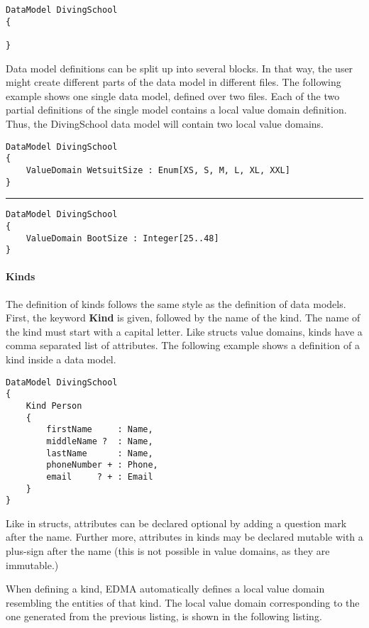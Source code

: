 \begin{lstlisting}[language=edma]
DataModel DivingSchool
{

}
\end{lstlisting}

Data model definitions can be split up into several blocks. In that
way, the user might create different parts of the data model in different
files. The following example shows one single data model, defined
over two files. Each of the two partial definitions of the single
model contains a local value domain definition. Thus, the DivingSchool
data model will contain two local value domains.

\begin{lstlisting}[language=edma]
DataModel DivingSchool
{
	ValueDomain WetsuitSize : Enum[XS, S, M, L, XL, XXL]
}
\end{lstlisting}
\hrule
\vspace{8pt}
\begin{lstlisting}[language=edma]
DataModel DivingSchool
{
	ValueDomain BootSize : Integer[25..48]
}
\end{lstlisting}


\paragraph{Kinds}

The definition of kinds follows the same style as the definition of
data models. First, the keyword \textbf{Kind} is given, followed by
the name of the kind. The name of the kind must start with a capital
letter. Like structs value domains, kinds have a comma separated list
of attributes. The following example shows a definition of a kind
inside a data model.

\begin{lstlisting}[language=edma]
DataModel DivingSchool
{
	Kind Person
	{
		firstName     : Name,
		middleName ?  : Name,
		lastName      : Name,
		phoneNumber + : Phone,
		email     ? + : Email
	}
}
\end{lstlisting}Like in structs, attributes can be declared optional by adding a question
mark after the name. Further more, attributes in kinds may be declared
mutable with a plus-sign after the name (this is not possible in value
domains, as they are immutable.)

When defining a kind, EDMA automatically defines a local value domain
resembling the entities of that kind. The local value domain corresponding
to the one generated from the previous listing, is shown in the following
listing.


